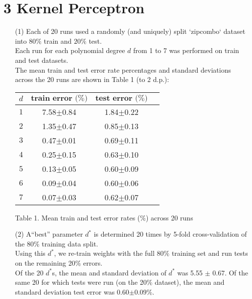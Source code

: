 \documentclass[a4paper,12pt]{article}
\begin{document}
\section*{3 Kernel Perceptron}
\begin{enumerate}

\item[(1)] 
Each of 20 runs used a randomly (and uniquely) split `zipcombo` dataset into $80\%$ train and $20\%$ test. \\
Each run for each polynomial degree $d$ from 1 to 7 was performed on train and test datasets.\\
The mean train and test error rate percentages and standard deviations across the 20 runs are shown in Table 1 (to 2 d.p.):

\begin{tabular}{|c|c|c|c|}
\hline
$d$&$\textbf{train error (\%)}$&$\textbf{test error (\%)}$\\
\hline
$1$&7.58$\pm$0.84&1.84$\pm$0.22\\
\hline
$2$&1.35$\pm$0.47&0.85$\pm$0.13\\
\hline
$3$&0.47$\pm$0.01&0.69$\pm$0.11\\
\hline
$4$&0.25$\pm$0.15&0.63$\pm$0.10\\
\hline
$5$&0.13$\pm$0.05&0.60$\pm$0.09\\
\hline
$6$&0.09$\pm$0.04&0.60$\pm$0.06\\
\hline
$7$&0.07$\pm$0.03&0.62$\pm$0.07\\
\hline
\end{tabular}\par 
Table 1. Mean train and test error rates (\%) across 20 runs

\item[(2)] 
A``best” parameter $d^*$ is determined 20 times by 5-fold cross-validation of the $80\%$ training data split. \\
Using this $d^*$, we re-train weights with the full $80\%$ training set and run tests on the remaining 20\% errors. \\
Of the 20 $d^*$s, the mean and standard deviation  of $d^*$ was 5.55 $\pm$ 0.67.
Of the same 20 for which tests were run (on the 20\% dataset), the mean and standard deviation test error was 0.60$\pm$0.09\%.

\end{enumerate}
\clearpage
\end{document}
